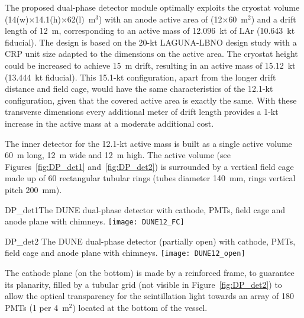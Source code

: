 The proposed dual-phase detector module optimally exploits the
cryostat volume (14(w)$\times$14.1(h)$\times$62(l)~m$^3$) with an
anode active area of (12$\times$60~m$^2$) and a drift length of 12~m,
corresponding to an active mass of 12.096~kt of LAr (10.643~kt
fiducial). The design is based on the 20-kt LAGUNA-LBNO design study
with a CRP unit size adapted to the dimensions on the active area. The
cryostat height could be increased to achieve 15~m drift, resulting in
an active mass of 15.12~kt (13.444~kt fiducial).  This 15.1-kt
configuration, apart from the longer drift distance and field cage,
would have the same characteristics of the 12.1-kt configuration,
given that the covered active area is exactly the same. With these
transverse dimensions every additional meter of drift length provides
a 1-kt increase in the active mass at a moderate additional cost.

The inner detector for the 12.1-kt active mass is built as a single
active volume 60~m long, 12~m wide and 12~m high. The active volume
(see Figures~\ref{fig:DP_det1} and~\ref{fig:DP_det2}) is surrounded by
a vertical field cage made up of 60 rectangular tubular rings (tubes
diameter 140~mm, rings vertical pitch 200~mm).
\begin{cdrfigure}{DP_det1}{The DUNE dual-phase 
detector with cathode, PMTs, field cage and anode plane with chimneys.}
\texttt{[image: DUNE12\_FC]}
\end{cdrfigure}
\begin{cdrfigure}{DP_det2}
{The DUNE dual-phase detector (partially open) with cathode, PMTs, field cage and anode plane with chimneys.}
\texttt{[image: DUNE12\_open]}
\end{cdrfigure}

The cathode plane (on the bottom) is made by a reinforced frame, to
guarantee its planarity, filled by a tubular grid (not visible in
Figure~\ref{fig:DP_det2}) to allow the optical transparency for the
scintillation light towards an array of 180 PMTs (1 per 4~m$^2$)
located at the bottom of the vessel.

